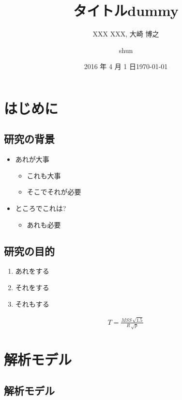\documentclass[compress,dvipdfmx,11pt]{beamer}
\title[IA 研究会 @ 富山大]{\bf タイトル}
\author[]{XXX XXX, 大崎 博之}
\institute{関西学院大学 理工学部 情報科学科}
\date{2016 年 4 月 1 日}
\author{shun}
\date{\today}
\title{dummy}
\begin{document}
\tableofcontents

\newcommand{\pivec}{\mathbf \pi}
\newcommand{\xvec}{\mathbf x}
\newcommand{\yvec}{\mathbf y}
\newcommand{\zvec}{\mathbf z}
\newcommand{\Emat}{\mathbf E}
\newcommand{\Imat}{\mathbf I}

\bf

\section{はじめに}
\label{sec:org4de439a}

\subsection{研究の背景}
\label{sec:org2d7a159}

\begin{itemize}
\item あれが大事
\begin{itemize}
\item これも大事
\item そこでそれが必要
\end{itemize}
\item ところでこれは?
\begin{itemize}
\item あれも必要
\end{itemize}
\end{itemize}

\subsection{研究の目的}
\label{sec:org62060a1}

\begin{enumerate}
\item あれをする
\item それをする
\item それもする
\end{enumerate}
\begin{align}
T = \frac{MSS \, \sqrt{1.5}}{R \, \sqrt{p}}
\end{align}

\section{解析モデル}
\label{sec:org8cfe6a5}

\subsection{解析モデル}
\label{sec:org8142e08}
\end{document}
